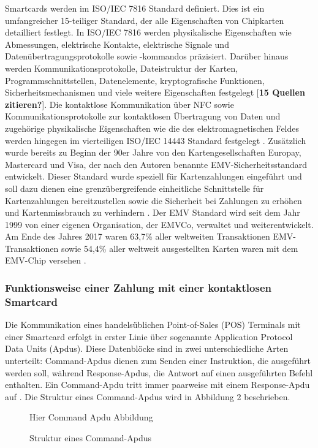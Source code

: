 Smartcards werden im ISO/IEC 7816 Standard definiert. Dies ist ein umfangreicher 15-teiliger Standard, der alle Eigenschaften von Chipkarten detailliert festlegt. In ISO/IEC 7816 werden physikalische Eigenschaften wie Abmessungen, elektrische Kontakte, elektrische Signale und Datenübertragungsprotokolle sowie -kommandos präzisiert. Darüber hinaus werden Kommunikationsprotokolle, Dateistruktur der Karten, Programmschnittstellen, Datenelemente, kryptografische Funktionen, Sicherheitsmechanismen und viele weitere Eigenschaften festgelegt [\textbf{15 Quellen zitieren?}]. Die kontaktlose Kommunikation über NFC sowie Kommunikationsprotokolle zur kontaktlosen Übertragung von Daten und zugehörige physikalische Eigenschaften wie die des elektromagnetischen Feldes werden hingegen im vierteiligen ISO/IEC 14443 Standard festgelegt \cite{iso14443-1, iso14443-2, iso14443-3,  iso14443-4}. Zusätzlich wurde bereits zu Beginn der 90er Jahre von den Kartengesellschaften Europay, Mastercard und Visa, der nach den Autoren benannte EMV-Sicherheitsstandard entwickelt. Dieser Standard wurde speziell für Kartenzahlungen eingeführt und soll dazu dienen eine grenzübergreifende einheitliche Schnittstelle für Kartenzahlungen bereitzustellen sowie die Sicherheit bei Zahlungen zu erhöhen und Kartenmissbrauch zu verhindern \cite{oenbSepa, emvChip}. Der EMV Standard wird seit dem Jahr 1999 von einer eigenen Organisation, der EMVCo, verwaltet und weiterentwickelt. Am Ende des Jahres 2017 waren 63,7\% aller weltweiten Transaktionen EMV-Transaktionen sowie 54,4\% aller weltweit ausgestellten Karten waren mit dem EMV-Chip versehen \cite{emvco}.

\subsubsection{Funktionsweise einer Zahlung mit einer kontaktlosen Smartcard}

Die Kommunikation eines handelsüblichen Point-of-Sales (POS) Terminals mit einer Smartcard erfolgt in erster Linie über sogenannte Application Protocol Data Units (Apdus). Diese Datenblöcke sind in zwei unterschiedliche Arten unterteilt: Command-Apdus dienen zum Senden einer Instruktion, die ausgeführt werden soll, während Response-Apdus, die Antwort auf einen ausgeführten Befehl enthalten. Ein Command-Apdu tritt immer paarweise mit einem Response-Apdu auf \cite{iso7816-4}. 
Die Struktur eines Command-Apdus wird in Abbildung 2 beschrieben.

\begin{figure}[h]
	\centering Hier Command Apdu Abbildung
	\caption{Struktur eines Command-Apdus}
\end{figure}

